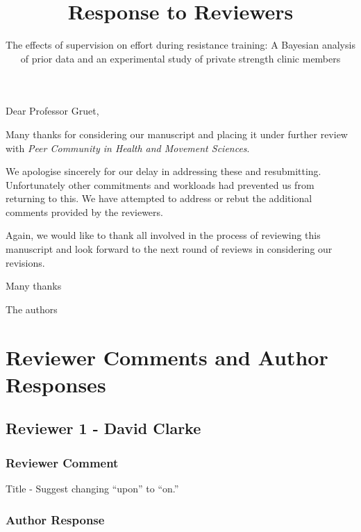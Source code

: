\documentclass[
  letterpaper,
  DIV=11,
  numbers=noendperiod]{scrartcl}
\title{Response to Reviewers}
\subtitle{The effects of supervision on effort during resistance
training: A Bayesian analysis of prior data and an experimental study of
private strength clinic members}
\author{}
\date{}
\begin{document}
\maketitle
\ifdefined\Shaded\renewenvironment{Shaded}{\begin{tcolorbox}[boxrule=0pt, breakable, interior hidden, sharp corners, enhanced, frame hidden, borderline west={3pt}{0pt}{shadecolor}]}{\end{tcolorbox}}\fi

Dear Professor Gruet,

Many thanks for considering our manuscript and placing it under further
review with \emph{Peer Community in Health and Movement Sciences}.

We apologise sincerely for our delay in addressing these and
resubmitting. Unfortunately other commitments and workloads had
prevented us from returning to this. We have attempted to address or
rebut the additional comments provided by the reviewers.

Again, we would like to thank all involved in the process of reviewing
this manuscript and look forward to the next round of reviews in
considering our revisions.

Many thanks

The authors

\hypertarget{reviewer-comments-and-author-responses}{%
\section{Reviewer Comments and Author
Responses}\label{reviewer-comments-and-author-responses}}

\hypertarget{reviewer-1---david-clarke}{%
\subsection{Reviewer 1 - David Clarke}\label{reviewer-1---david-clarke}}

\hypertarget{reviewer-comment}{%
\subsubsection{Reviewer Comment}\label{reviewer-comment}}

Title - Suggest changing ``upon'' to ``on.''

\hypertarget{author-response}{%
\subsubsection{Author Response}\label{author-response}}
\end{document}

